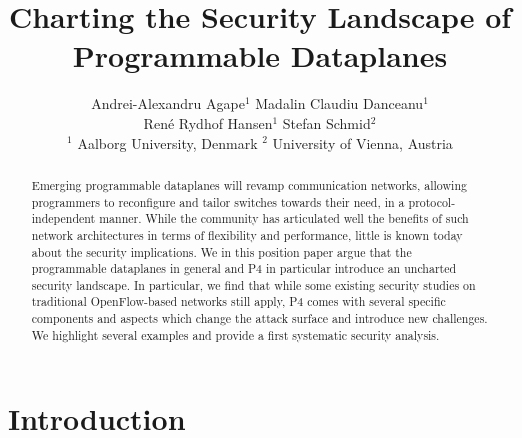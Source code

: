 \documentclass[10pt,sigconf]{acmart}
\begin{document}
\title[Security Landscape of Programmable Dataplanes]{Charting the Security Landscape of\\Programmable Dataplanes}


\author{Andrei-Alexandru Agape$^1$ \quad 
Madalin Claudiu Danceanu$^1$ \\
Ren{\'e} Rydhof Hansen$^1$ \quad 
Stefan Schmid$^2$\\
{\footnotesize $^1$ Aalborg University, Denmark}\quad 
{\footnotesize $^2$ University of Vienna, Austria}
}

\date{}




\renewcommand\footnotetextcopyrightpermission[1]{}


\acmDOI{}

\acmISBN{}
\acmPrice{}


\renewcommand{\shortauthors}{Agape et al.}

\sloppy

\begin{abstract}
Emerging programmable dataplanes will
revamp communication networks, allowing 
programmers to reconfigure and tailor switches
towards their need, in a protocol-independent manner.
While the community has articulated well
the benefits of such network architectures in terms of flexibility and 
performance, 
little is known today about the security implications.
%
We in this position paper argue that the programmable dataplanes
in general and P4 in particular introduce an uncharted security landscape.
In particular, we find that while some existing security studies 
on traditional OpenFlow-based networks still apply, P4 comes with
several specific components and aspects which change the attack surface
and introduce new challenges. We highlight several examples and
provide a first systematic security analysis.
\end{abstract}

\maketitle

\section{Introduction}
\end{document}
